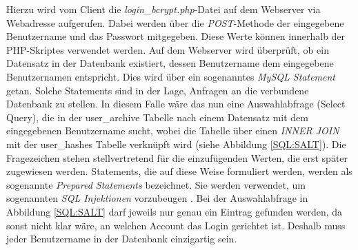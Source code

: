 \documentclass[../main.tex]{subfiles}
\begin{document}
	Hierzu wird vom Client die \emph{login\_bcrypt.php}-Datei auf dem Webserver via Webadresse aufgerufen. Dabei werden über die \emph{POST}-Methode der eingegebene Benutzername und das Passwort mitgegeben. Diese Werte können innerhalb der PHP-Skriptes verwendet werden. Auf dem Webserver wird überprüft, ob ein Datensatz in der Datenbank existiert, dessen Benutzername dem eingegebene Benutzernamen entspricht. Dies wird über ein sogenanntes \emph{MySQL Statement} getan. Solche Statements sind in der Lage, Anfragen an die verbundene Datenbank zu stellen. In diesem Falle wäre das nun eine Auswahlabfrage (Select Query), die in der user\_archive Tabelle nach einem Datensatz mit dem eingegebenen Benutzername sucht, wobei die Tabelle über einen \emph{INNER JOIN} mit der user\_hashes Tabelle verknüpft wird (siehe Abbildung \ref{SQL:SALT}). Die Fragezeichen stehen stellvertretend für die einzufügenden Werten, die erst später zugewiesen werden. Statements, die auf diese Weise formuliert werden, werden als sogenannte \emph{Prepared Statements} bezeichnet. Sie werden verwendet, um sogenannten \emph{SQL Injektionen} vorzubeugen \cite{preparedstatement}. Bei der Auswahlabfrage in Abbildung \ref{SQL:SALT} darf jeweils nur genau ein Eintrag gefunden werden, da sonst nicht klar wäre, an welchen Account das Login gerichtet ist. Deshalb muss jeder Benutzername in der Datenbank einzigartig sein.
 
\end{document}
